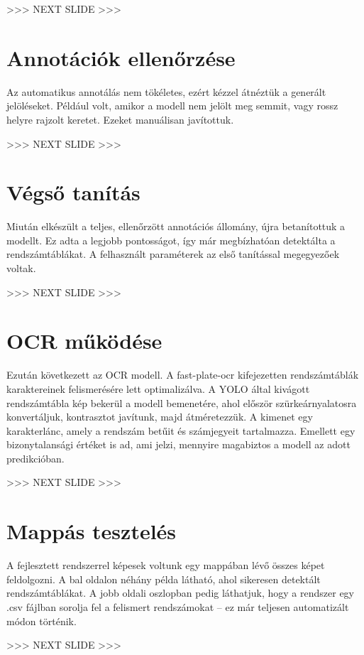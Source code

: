 \documentclass[12pt]{article}
\begin{document}
>>> NEXT SLIDE >>>

\section*{Annotációk ellenőrzése}

Az automatikus annotálás nem tökéletes, ezért kézzel átnéztük a generált jelöléseket.
Például volt, amikor a modell nem jelölt meg semmit, vagy rossz helyre rajzolt keretet.
Ezeket manuálisan javítottuk.

>>> NEXT SLIDE >>>

\section*{Végső tanítás}

Miután elkészült a teljes, ellenőrzött annotációs állomány, újra betanítottuk a modellt.
Ez adta a legjobb pontosságot, így már megbízhatóan detektálta a rendszámtáblákat.
A felhasznált paraméterek az első tanítással megegyezőek voltak.

>>> NEXT SLIDE >>>

\section*{OCR működése}

Ezután következett az OCR modell. A fast-plate-ocr kifejezetten rendszámtáblák karaktereinek felismerésére lett optimalizálva.
A YOLO által kivágott rendszámtábla kép bekerül a modell bemenetére, ahol először szürkeárnyalatosra konvertáljuk, kontrasztot javítunk, majd átméretezzük.
A kimenet egy karakterlánc, amely a rendszám betűit és számjegyeit tartalmazza.
Emellett egy bizonytalansági értéket is ad, ami jelzi, mennyire magabiztos a modell az adott predikcióban.

>>> NEXT SLIDE >>>

\section*{Mappás tesztelés}

A fejlesztett rendszerrel képesek voltunk egy mappában lévő összes képet feldolgozni.
A bal oldalon néhány példa látható, ahol sikeresen detektált rendszámtáblákat.
A jobb oldali oszlopban pedig láthatjuk, hogy a rendszer egy .csv fájlban sorolja fel a felismert rendszámokat – ez már teljesen automatizált módon történik.

>>> NEXT SLIDE >>>
\end{document}
